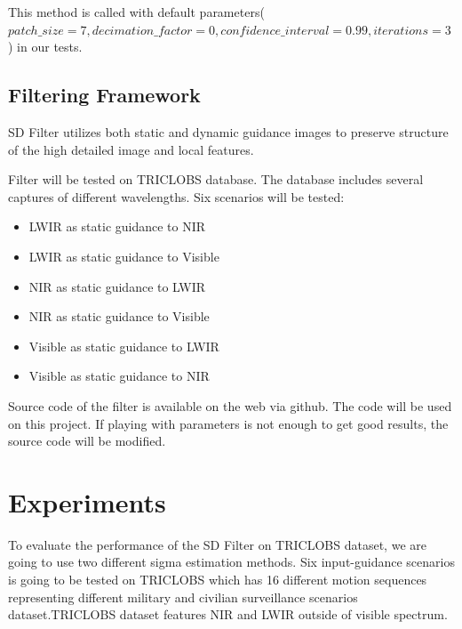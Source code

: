 \documentclass[10pt,twocolumn,letterpaper]{article}
\begin{document}
This method is called with default parameters(\(patch\_size=7, decimation\_factor=0, confidence\_interval=0.99, iterations=3\)) in our tests.
\subsection{Filtering Framework}\label{ss:filter-framework}
SD Filter\cite{ham2015} utilizes both static and dynamic guidance images to preserve structure of the high detailed image and local features.

Filter will be tested on TRICLOBS\cite{triclobs} database. The database includes several captures of different wavelengths. Six scenarios will be tested:
\begin{itemize}
	\item LWIR as static guidance to NIR
	\item LWIR as static guidance to Visible
	\item NIR as static guidance to LWIR
	\item NIR as static guidance to Visible
	\item Visible as static guidance to LWIR
	\item Visible as static guidance to NIR
\end{itemize}

Source code of the filter is available on the web via github\cite{github:sdfilter}. The code will be used on this project. If playing with parameters is not enough to get good results, the source code will be modified.

\section{Experiments}

To evaluate the performance of the SD Filter\cite{ham2015} on TRICLOBS\cite{triclobs} dataset, we are going to use two different sigma estimation methods. Six input-guidance scenarios is going to be tested on TRICLOBS which has  16 different motion sequences representing different military and civilian surveillance scenarios dataset.TRICLOBS dataset features NIR and LWIR outside of visible spectrum. 
\end{document}
